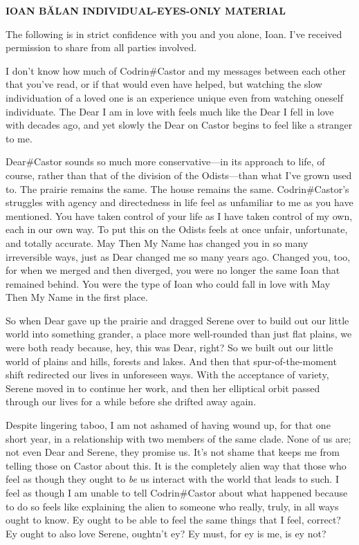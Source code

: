 \begin{center}
\textbf{IOAN BĂLAN INDIVIDUAL-EYES-ONLY MATERIAL}
\end{center}

\noindent The following is in strict confidence with you and you alone, Ioan. I've received permission to share from all parties involved.

I don't know how much of Codrin\#Castor and my messages between each other that you've read, or if that would even have helped, but watching the slow individuation of a loved one is an experience unique even from watching oneself individuate. The Dear I am in love with feels much like the Dear I fell in love with decades ago, and yet slowly the Dear on Castor begins to feel like a stranger to me.

Dear\#Castor sounds so much more conservative—in its approach to life, of course, rather than that of the division of the Odists—than what I've grown used to. The prairie remains the same. The house remains the same. Codrin\#Castor's struggles with agency and directedness in life feel as unfamiliar to me as you have mentioned. You have taken control of your life as I have taken control of my own, each in our own way. To put this on the Odists feels at once unfair, unfortunate, and totally accurate. May Then My Name has changed you in so many irreversible ways, just as Dear changed me so many years ago. Changed you, too, for when we merged and then diverged, you were no longer the same Ioan that remained behind. You were the type of Ioan who could fall in love with May Then My Name in the first place.

So when Dear gave up the prairie and dragged Serene over to build out our little world into something grander, a place more well-rounded than just flat plains, we were both ready because, hey, this was Dear, right? So we built out our little world of plains and hills, forests and lakes. And then that spur-of-the-moment shift redirected our lives in unforeseen ways. With the acceptance of variety, Serene moved in to continue her work, and then her elliptical orbit passed through our lives for a while before she drifted away again.

Despite lingering taboo, I am not ashamed of having wound up, for that one short year, in a relationship with two members of the same clade. None of us are; not even Dear and Serene, they promise us. It's not shame that keeps me from telling those on Castor about this. It is the completely alien way that those who feel as though they ought to \emph{be} us interact with the world that leads to such. I feel as though I am unable to tell Codrin\#Castor about what happened because to do so feels like explaining the alien to someone who really, truly, in all ways ought to know. Ey ought to be able to feel the same things that I feel, correct? Ey ought to also love Serene, oughtn't ey? Ey must, for ey is me, is ey not?

